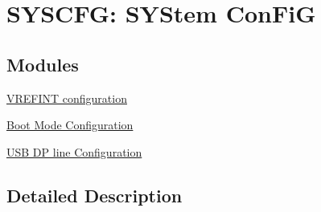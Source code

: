 \hypertarget{group___s_y_s_c_f_g___macros}{\section{S\-Y\-S\-C\-F\-G\-: S\-Y\-Stem Con\-Fi\-G}
\label{group___s_y_s_c_f_g___macros}
}
\subsection*{Modules}
\begin{DoxyCompactItemize}
\item 
\hyperlink{group___s_y_s_c_f_g___vref_int}{V\-R\-E\-F\-I\-N\-T configuration}
\item 
\hyperlink{group___s_y_s_c_f_g___boot_mode_config}{Boot Mode Configuration}
\item 
\hyperlink{group___s_y_s_c_f_g___u_s_b_config}{U\-S\-B D\-P line Configuration}
\end{DoxyCompactItemize}


\subsection{Detailed Description}
